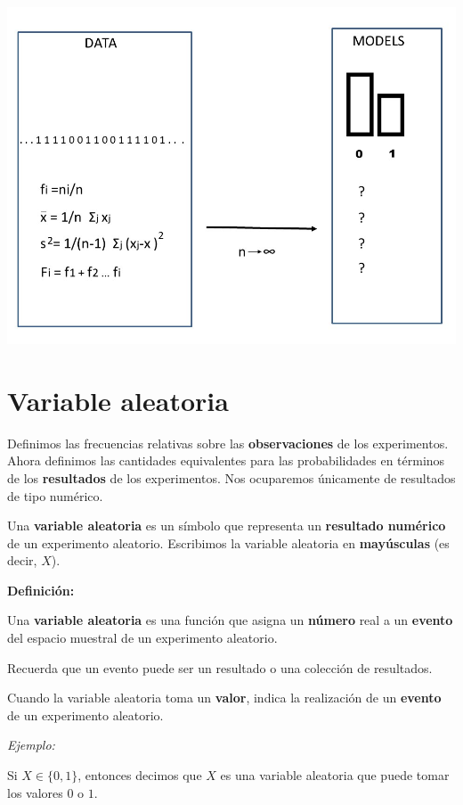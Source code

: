 \documentclass[
]{book}
\begin{document}
\includegraphics{./figures/randomvar.JPG}

\hypertarget{variable-aleatoria}{%
\section{Variable aleatoria}\label{variable-aleatoria}}

Definimos las frecuencias relativas sobre las \textbf{observaciones} de los experimentos. Ahora definimos las cantidades equivalentes para las probabilidades en términos de los \textbf{resultados} de los experimentos. Nos ocuparemos únicamente de resultados de tipo numérico.

Una \textbf{variable aleatoria} es un símbolo que representa un \textbf{resultado numérico} de un experimento aleatorio. Escribimos la variable aleatoria en \textbf{mayúsculas} (es decir, \(X\)).

\textbf{Definición:}

Una \textbf{variable aleatoria} es una función que asigna un \textbf{número} real a un \textbf{evento} del espacio muestral de un experimento aleatorio.

Recuerda que un evento puede ser un resultado o una colección de resultados.

Cuando la variable aleatoria toma un \textbf{valor}, indica la realización de un \textbf{evento} de un experimento aleatorio.

\emph{Ejemplo:}

Si \(X \in \{0,1\}\), entonces decimos que \(X\) es una variable aleatoria que puede tomar los valores \(0\) o \(1\).
\end{document}
